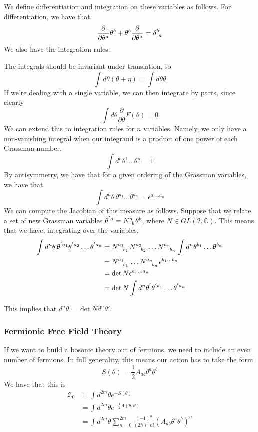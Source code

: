 \documentclass[11pt, oneside]{article}   	%
\theoremstyle{slanted}
\begin{document}
We define differentiation and 
integration on these variables as follows.
For differentiation, we have that 
\[
\frac{\partial}{\partial \theta ^ a  } \theta ^ b + \theta ^ b \frac{\partial   }{\partial  \theta ^ a }  
= \delta \indices{ ^ b _ a }  
\] We 
also have the integration rules. 

The integrals should be invariant under 
translation, so 
\[
\int d \theta \left( \theta + \eta  \right)   = \int d \theta \theta 
\] If we're dealing with a single variable, 
we can then integrate by parts, since clearly 
\[
\int d \theta \frac{\partial   }{\partial  \theta }  F \left( \theta  \right)    = 0 	 
\]  We can extend this to 
integration rules for $ n $ variables. 
Namely, we only have a non-vanishing integral when 
our integrand is a product of one power 
of each Grassman number.
\[
\int d ^ n \theta ^ 1 \dots \theta ^ n  = 1 
\] By antisymmetry, we have that for a 
given ordering of the Grassman variables, we have that 
\[
\int d ^ n \theta \, \theta ^{ a_1 } \dots \theta ^{ a _ n  }
= \epsilon ^{ a_1 \dots a_ n} 
\] We can compute the Jacobian of 
this measure as follows. Suppose 
that we relate a set of new Grassman 
variables $ \theta^{  ' a  }  = N \indices{^ a _ b } \theta ^ b  $, 
where $ N \in GL \left( 2 , \mathbb{ C }  \right)   $. 
This means that 
we have, integrating over the variables, 
\begin{align*}
\int d ^ n \theta \, \theta ^{ ' a_1  } \theta ^{ ' a_2  } \dots \theta ^{  ' a_ n  } 
&=  N \indices{ ^{ a_1 } _{ b_ 1 } } N \indices{ ^{ a_2  } _{ b_2 } } 
\dots N \indices{ ^{ a_n  } _{ b_n  }  } \int d^ n \theta ^{ b_ 1 } \dots \theta ^{ b _ n }  \\
&=  N \indices{ ^{ a_1 } _{ b_1 }  } \dots N \indices{ ^{ a_ n } _{b _ n } } 
\epsilon ^{ b_ 1 \dots b _ n }  \\
&=  \det N \epsilon ^{ a_1 \dots a_  n }  \\
&=  \det N \int d ^ n \theta ^{  ' } \theta^{ ' a_1 } \dots \theta ^{  ' a _n  }  
\end{align*} 

This implies that $ d ^ n  \theta  = \det N d ^ n \theta ' $.

\subsubsection{Fermionic Free Field Theory}
If we 
want to build a bosonic theory out of fermions, 
we need to include an even number of 
fermions. 
In full generality, this 
means our action has to take the form 
\[
S \left( \theta  \right)  = \frac{1}{2 } A_{ ab } \theta ^ a \theta ^ b 
\] We have that this is 
\begin{align*}
\mathcal{ Z }_ 0  &=  \int  d^{ 2m } \theta e ^{  - S\left( \theta  \right)   }  \\ 
&=  \int d ^{ 2m } \theta e ^{  - \frac{1}{2  } A\left( \theta, \theta  \right) } \\
&=  \int d ^{ 2m } \theta 
\sum_{ n  =0 } ^{ 2m } \frac{\left(  - 1  \right)  ^ n }{ 
\left( 2 \hbar  \right)  ^ n n !  } \left( A _{ ab } \theta ^ a 
\theta ^ b \right)  ^ n 
\end{align*}
\end{document}
